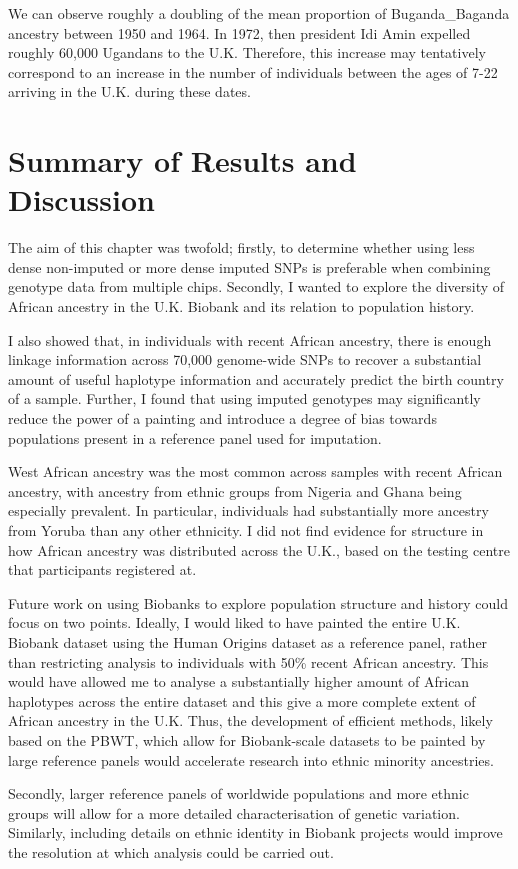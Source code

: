 We can observe roughly a doubling of the mean proportion of  Buganda\_Baganda ancestry between 1950 and 1964. In 1972, then president Idi Amin expelled roughly 60,000 Ugandans to the U.K. Therefore, this increase may tentatively correspond to an increase in the number of individuals between the ages of 7-22 arriving in the U.K. during these dates. 

\section{Summary of Results and Discussion} 

The aim of this chapter was twofold; firstly, to determine whether using less dense non-imputed or more dense imputed SNPs is preferable when combining genotype data from multiple chips. Secondly, I wanted to explore the diversity of African ancestry in the U.K. Biobank and its relation to population history.  

I also showed that, in individuals with recent African ancestry, there is enough linkage information across 70,000 genome-wide SNPs to recover a substantial amount of useful haplotype information and accurately predict the birth country of a sample. Further, I found that using imputed genotypes may significantly reduce the power of a painting and introduce a degree of bias towards populations present in a reference panel used for imputation. 

West African ancestry was the most common across samples with recent African ancestry, with ancestry from ethnic groups from Nigeria and Ghana being especially prevalent. In particular, individuals had substantially more ancestry from Yoruba than any other ethnicity. I did not find evidence for structure in how African ancestry was distributed across the U.K., based on the testing centre that participants registered at. 

Future work on using Biobanks to explore population structure and history could focus on two points.
Ideally, I would liked to have painted the entire U.K. Biobank dataset using the Human Origins dataset as a reference panel, rather than restricting analysis to individuals with 50\% recent African ancestry. This would have allowed me to analyse a substantially higher amount of African haplotypes across the entire dataset and this give a more complete extent of African ancestry in the U.K. Thus, the development of efficient methods, likely based on the PBWT, which allow for Biobank-scale datasets to be painted by large reference panels would accelerate research into ethnic minority ancestries. 

Secondly, larger reference panels of worldwide populations and more ethnic groups will allow for a more detailed characterisation of genetic variation.  Similarly, including details on ethnic identity in Biobank projects would improve the resolution at which analysis could be carried out.  


